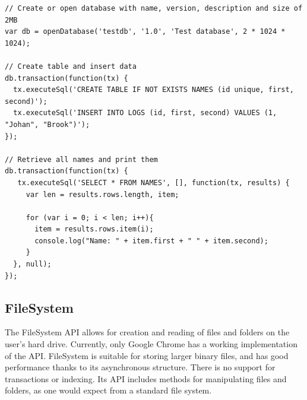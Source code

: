 \begin{Code}
\begin{lstlisting}[caption={Use of WebSQL}, label={lst:websql}]
// Create or open database with name, version, description and size of 2MB
var db = openDatabase('testdb', '1.0', 'Test database', 2 * 1024 * 1024);

// Create table and insert data
db.transaction(function(tx) {
  tx.executeSql('CREATE TABLE IF NOT EXISTS NAMES (id unique, first, second)');
  tx.executeSql('INSERT INTO LOGS (id, first, second) VALUES (1, "Johan", "Brook")');
});

// Retrieve all names and print them
db.transaction(function(tx) {
   tx.executeSql('SELECT * FROM NAMES', [], function(tx, results) {
     var len = results.rows.length, item;

     for (var i = 0; i < len; i++){
       item = results.rows.item(i);
       console.log("Name: " + item.first + " " + item.second);
     }
  }, null);
});
\end{lstlisting}
\end{Code}

\subsection{FileSystem}
\label{sec:filesystem}
The FileSystem API allows for creation and reading of files and folders on the user's hard drive. Currently, only Google Chrome has a working implementation of the API. FileSystem is suitable for storing larger binary files, and has good performance thanks to its asynchronous structure. There is no support for transactions or indexing. Its API includes methods for manipulating files and folders, as one would expect from a standard file system.

